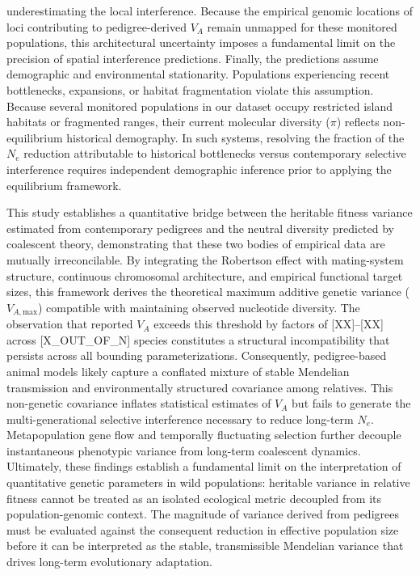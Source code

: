 \documentclass[12pt]{article}
\begin{document}
underestimating the local interference. Because the empirical genomic locations of loci contributing to pedigree-derived $V_A$ remain unmapped for these monitored populations, this architectural uncertainty imposes a fundamental limit on the precision of spatial interference predictions. Finally, the predictions assume demographic and environmental stationarity. Populations experiencing recent bottlenecks, expansions, or habitat fragmentation violate this assumption. Because several monitored populations in our dataset occupy restricted island habitats or fragmented ranges, their current molecular diversity ($\pi$) reflects non-equilibrium historical demography. In such systems, resolving the fraction of the $N_e$ reduction attributable to historical bottlenecks versus contemporary selective interference requires independent demographic inference prior to applying the equilibrium framework.

This study establishes a quantitative bridge between the heritable fitness variance estimated from contemporary pedigrees and the neutral diversity predicted by coalescent theory, demonstrating that these two bodies of empirical data are mutually irreconcilable. By integrating the Robertson effect with mating-system structure, continuous chromosomal architecture, and empirical functional target sizes, this framework derives the theoretical maximum additive genetic variance ($V_{A,\text{max}}$) compatible with maintaining observed nucleotide diversity. The observation that reported $V_A$ exceeds this threshold by factors of [XX]–[XX] across [X\_OUT\_OF\_N] species constitutes a structural incompatibility that persists across all bounding parameterizations. Consequently, pedigree-based animal models likely capture a conflated mixture of stable Mendelian transmission and environmentally structured covariance among relatives. This non-genetic covariance inflates statistical estimates of $V_A$ but fails to generate the multi-generational selective interference necessary to reduce long-term $N_e$. Metapopulation gene flow and temporally fluctuating selection further decouple instantaneous phenotypic variance from long-term coalescent dynamics. Ultimately, these findings establish a fundamental limit on the interpretation of quantitative genetic parameters in wild populations: heritable variance in relative fitness cannot be treated as an isolated ecological metric decoupled from its population-genomic context. The magnitude of variance derived from pedigrees must be evaluated against the consequent reduction in effective population size before it can be interpreted as the stable, transmissible Mendelian variance that drives long-term evolutionary adaptation.
\end{document}
